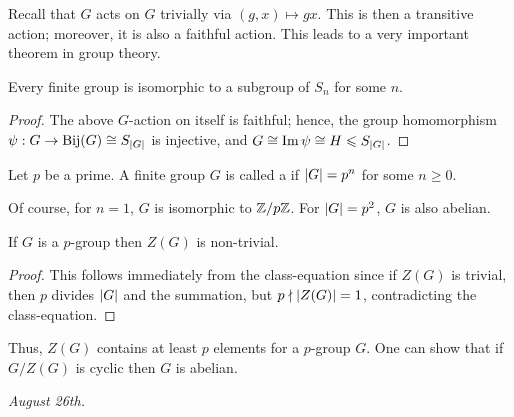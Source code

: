 Recall that $G$ acts on $G$ trivially via $(g,x) \mapsto gx$. This is then a transitive action; moreover, it is also a faithful action. This leads to a very important theorem in group theory.

\begin{theorem}
    Every finite group is isomorphic to a subgroup of $S_{n}$ for some $n$.
\end{theorem}

\begin{proof}
    The above $G$-action on itself is faithful; hence, the group homomorphism $\psi:G \to \operatorname{Bij}(G) \cong S_{\left| G \right|}$ is injective, and $G \cong \operatorname{Im} \psi \cong H \leqslant S_{\left| G \right|}$.
\end{proof}

\begin{definition}
    Let $p$ be a prime. A finite group $G$ is called a  if $\left| G \right| = p^{n}$ for some $n \geq 0$.
\end{definition}
Of course, for $n = 1$, $G$ is isomorphic to $\mathbb{Z}/p\mathbb{Z}$. For $\left| G \right| = p^{2}$, $G$ is also abelian.
\begin{proposition}
    If $G$ is a $p$-group then $Z(G)$ is non-trivial.
\end{proposition}
\begin{proof}
    This follows immediately from the class-equation since if $Z(G)$ is trivial, then $p$ divides $\left| G \right|$ and the summation, but $p \nmid \left| Z(G) \right| = 1$, contradicting the class-equation.
\end{proof}
Thus, $Z(G)$ contains at least $p$ elements for a $p$-group $G$. One can show that if $G/Z(G)$ is cyclic then $G$ is abelian.

\textit{August 26th.}

